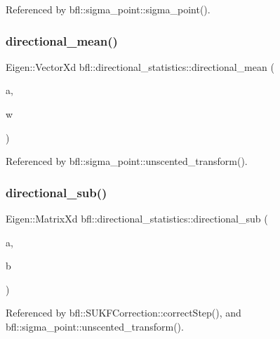 Referenced by bfl\+::sigma\+\_\+point\+::sigma\+\_\+point().

\mbox{\label{namespacebfl_1_1directional__statistics_ad8758aac208bc2baa75aad514a3f53e6}} 
\subsubsection{\texorpdfstring{directional\+\_\+mean()}{directional\_mean()}}
{\footnotesize\ttfamily Eigen\+::\+Vector\+Xd bfl\+::directional\+\_\+statistics\+::directional\+\_\+mean (\begin{DoxyParamCaption}\item[{const Eigen\+::\+Ref$<$ const Eigen\+::\+Matrix\+Xd $>$ \&}]{a,  }\item[{const Eigen\+::\+Ref$<$ const Eigen\+::\+Vector\+Xd $>$ \&}]{w }\end{DoxyParamCaption})}



Referenced by bfl\+::sigma\+\_\+point\+::unscented\+\_\+transform().

\mbox{\label{namespacebfl_1_1directional__statistics_a18bffca88c7ea5f4ea11d2ad910736fe}} 
\subsubsection{\texorpdfstring{directional\+\_\+sub()}{directional\_sub()}}
{\footnotesize\ttfamily Eigen\+::\+Matrix\+Xd bfl\+::directional\+\_\+statistics\+::directional\+\_\+sub (\begin{DoxyParamCaption}\item[{const Eigen\+::\+Ref$<$ const Eigen\+::\+Matrix\+Xd $>$ \&}]{a,  }\item[{const Eigen\+::\+Ref$<$ const Eigen\+::\+Vector\+Xd $>$ \&}]{b }\end{DoxyParamCaption})}



Referenced by bfl\+::\+S\+U\+K\+F\+Correction\+::correct\+Step(), and bfl\+::sigma\+\_\+point\+::unscented\+\_\+transform().

